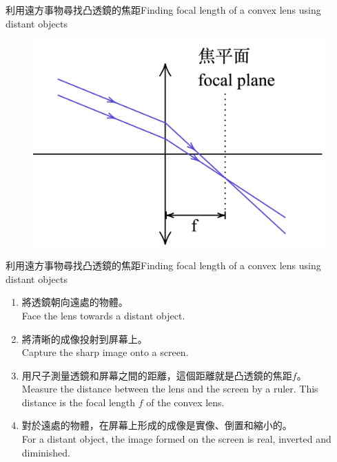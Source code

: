\documentclass[beamer=true]{standalone}
\begin{document}



\begin{frame}{利用遠方事物尋找凸透鏡的焦距Finding focal length of a convex lens using distant objects}
    \begin{figure}
        \centering
        \includegraphics[width=0.7\linewidth]{assets/ddun2du8923.png}


    \end{figure}





\end{frame}

\begin{frame}{利用遠方事物尋找凸透鏡的焦距Finding focal length of a convex lens using distant objects}
    \begin{enumerate}
        \setlength{\itemsep}{.6em}
        \item 將透鏡朝向遠處的物體。\\Face the lens towards a distant object.
        \item 將清晰的成像投射到屏幕上。\\Capture the sharp image onto a screen.
        \item 用尺子測量透鏡和屏幕之間的距離，這個距離就是凸透鏡的焦距$f$。\\Measure the distance between the lens and the screen by a ruler. This distance is the focal length $f$ of the convex lens.
        \item 對於遠處的物體，在屏幕上形成的成像是實像、倒置和縮小的。\\For a distant object, the image formed on the screen is real, inverted and diminished.
    \end{enumerate}
\end{frame}
\end{document}
